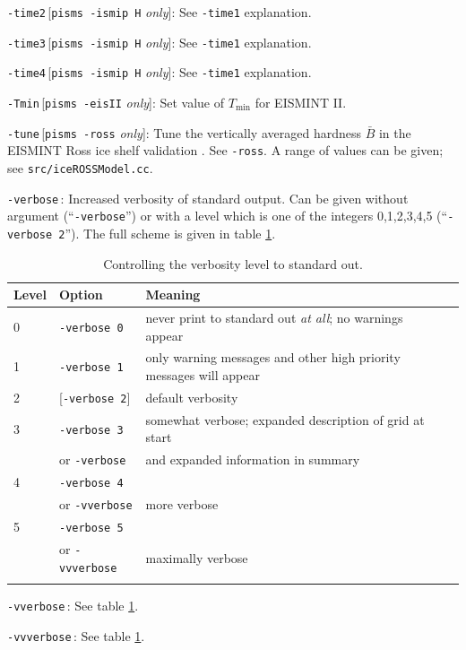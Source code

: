 \documentclass[11pt,final]{amsart}
\renewcommand{\t}[1]{\texttt{#1}}
\newcommand{\rawopt}[1]{\vspace{1mm}\noindent \Large\texttt{-#1}\normalsize}
\newcommand{\opt}[1]{\rawopt{#1}\,:\quad}
\newcommand{\optrestrict}[2]{\rawopt{#1}\,[\texttt{#2} \textsl{only}]:\quad}
\begin{document}
\optrestrict{time2}{pisms -ismip H}  See \verb|-time1| explanation.

\optrestrict{time3}{pisms -ismip H}  See \verb|-time1| explanation.

\optrestrict{time4}{pisms -ismip H}  See \verb|-time1| explanation.

\optrestrict{Tmin}{pisms -eisII}    Set value of $T_{\text{min}}$ for EISMINT II.

\optrestrict{tune}{pisms -ross}    Tune the vertically averaged hardness $\bar B$ in the EISMINT Ross ice shelf validation \cite{MacAyealetal}.  See \verb|-ross|.  A range of values can be given; see \verb|src/iceROSSModel.cc|.

\opt{verbose}   Increased verbosity of standard output.  Can be given without argument (``\verb|-verbose|'') or with a level which is one of the integers 0,1,2,3,4,5 (``\verb|-verbose 2|'').  The full scheme is given in table \ref{tab:verbosity}.

\begin{table}[h]
\caption{Controlling the verbosity level to standard out.}\label{tab:verbosity}
\begin{tabular}{@{}llll}\hline
\textbf{Level} & \textbf{Option} & \textbf{Meaning} \\ \hline
   0  &  \t{-verbose 0} &   never print to standard out \emph{at all}; no warnings appear  \\
   1  &  \t{-verbose 1} &   only warning messages and other high priority messages will appear  \\
   2  &  [\t{-verbose 2}] & default verbosity    \\
   3  &  \t{-verbose 3} &   somewhat verbose; expanded description of grid at start  \\
      &  or \quad \t{-verbose} &  and expanded information in summary    \\
   4  &  \t{-verbose 4} &     \\
      &  or \quad \t{-vverbose} &  more verbose    \\
   5  &  \t{-verbose 5} &     \\
      &  or \quad \t{-vvverbose} &  maximally verbose \\
\hline
\normalsize
\end{tabular}
\end{table}

\opt{vverbose}   See table \ref{tab:verbosity}.

\opt{vvverbose}   See table \ref{tab:verbosity}.
\end{document}
